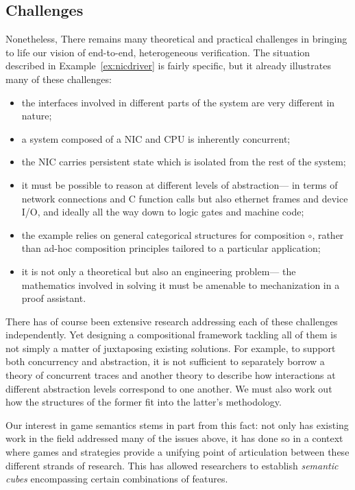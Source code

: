 \subsection{Challenges}

Nonetheless,
There remains many theoretical and practical challenges
in bringing to life
our vision of end-to-end, heterogeneous verification.
The situation described in Example~\ref{ex:nicdriver}
is fairly specific, but it already illustrates many of these challenges:
\begin{itemize}
  \item the interfaces involved in different parts of the system
    are very different in nature;
  \item a system composed of a NIC and CPU
    is inherently concurrent;
  \item the NIC carries persistent state
    which is isolated from the rest of the system;
  \item it must be possible to reason at different levels of abstraction---%
    in terms of network connections and C function calls
    but also ethernet frames and device I/O, and
    ideally all the way down to logic gates and machine code;
  \item the example relies on general categorical structures for composition $\circ$,
    rather than ad-hoc composition principles tailored to a particular application;
  \item it is not only a theoretical but also an engineering problem---%
    the mathematics involved in solving it must be
    amenable to mechanization in a proof assistant.
\end{itemize}
There has of course been
extensive research
addressing each of these challenges independently.
Yet designing a compositional framework tackling all of them
is not simply a matter of juxtaposing existing solutions.
For example,
to support both concurrency and abstraction,
it is not sufficient to separately borrow
a theory of concurrent traces and
another theory to describe
how interactions at different abstraction levels
correspond to one another.
We must also work out how the structures
of the former
fit into the latter's methodology.

Our interest in game semantics
stems in part from this fact:
not only has existing work in the field
addressed many of the issues above,
it has done so in a context where games and strategies
provide a unifying point of articulation
between these different strands of research.
This has allowed researchers
to establish \emph{semantic cubes}
encompassing certain combinations of features.

